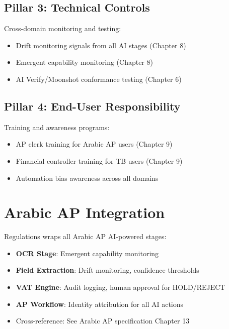 \subsection{Pillar 3: Technical Controls}

Cross-domain monitoring and testing:

\begin{itemize}
  \item Drift monitoring signals from all AI stages (Chapter 8)
  \item Emergent capability monitoring (Chapter 8)
  \item AI Verify/Moonshot conformance testing (Chapter 6)
\end{itemize}

\subsection{Pillar 4: End-User Responsibility}

Training and awareness programs:

\begin{itemize}
  \item AP clerk training for Arabic AP users (Chapter 9)
  \item Financial controller training for TB users (Chapter 9)
  \item Automation bias awareness across all domains
\end{itemize}

\section{Arabic AP Integration}
\label{sec:arabic-integration}

Regulations wraps all Arabic AP AI-powered stages:

\begin{itemize}
  \item \textbf{OCR Stage}: Emergent capability monitoring
  \item \textbf{Field Extraction}: Drift monitoring, confidence thresholds
  \item \textbf{VAT Engine}: Audit logging, human approval for HOLD/REJECT
  \item \textbf{AP Workflow}: Identity attribution for all AI actions
  \item Cross-reference: See Arabic AP specification Chapter 13
\end{itemize}

